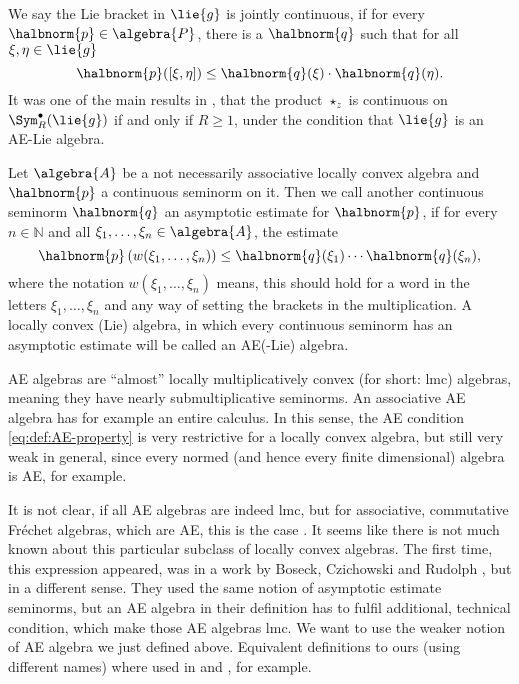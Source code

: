 \documentclass[
11pt,                          %
english                        %
]{article}
\begin{document}
We say the Lie bracket in $\lie{g}$ is jointly continuous, if for every 
$\halbnorm{p} \in \algebra{P}$, there is a $\halbnorm{q}$ such that for all $\xi, 
\eta \in \lie{g}$
\begin{equation}
	\label{eq:continuity-of-liebracket}
	\halbnorm{p}([\xi, \eta])
	\leq
	\halbnorm{q}(\xi) \cdot \halbnorm{q}(\eta).
\end{equation}
It was one of the main results in \cite{esposito.stapor.waldmann:2015a:pre}, that 
the product $\star_z$ is continuous on $\Sym_R^{\bullet}(\lie{g})$ if and only if 
$R \geq 1$, under the condition that $\lie{g}$ is an AE-Lie algebra.
\begin{definition}[AE-algebra]
	\label{def:AE-algebra}
	Let $\algebra{A}$ be a not necessarily associative locally convex algebra
	and $\halbnorm{p}$ a continuous seminorm on it. Then we call
	another continuous seminorm $\halbnorm{q}$ an asymptotic estimate for 
	$\halbnorm{p}$, if for every $n \in \mathbb{N}$ and all $\xi_1, \ldots, \xi_n
	\in \algebra{A}$, the estimate
	\begin{equation}
		\label{eq:def:AE-property}
		\halbnorm{p}\left(
			w(\xi_1, \ldots, \xi_n)
		\right)
		\leq
		\halbnorm{q}(\xi_1) \cdots \halbnorm{q}(\xi_n),
	\end{equation}
	where the notation $w(\xi_1, \ldots, \xi_n)$ means, this should hold for a word 
	in the letters $\xi_1, \ldots, \xi_n$ and any
	way of setting the brackets in the multiplication. A locally convex (Lie) 
	algebra, in which every continuous seminorm has an asymptotic estimate will be 
	called an AE(-Lie) algebra.
\end{definition}
AE algebras are ``almost'' locally multiplicatively convex (for short: lmc) 
algebras, meaning they have nearly submultiplicative seminorms. An associative AE 
algebra has for example an entire calculus. In this sense, the AE condition 
\eqref{eq:def:AE-property} is very restrictive for a locally convex algebra, but 
still very weak in general, since every normed (and hence every finite dimensional) 
algebra is AE, for example.

It is not clear, if all AE algebras are indeed lmc, but for associative, commutative 
Fr\'echet algebras, which are AE, this is the case 
\cite{mitiagin.rolewicz.zelazko:1962a}. It seems like there is not much known about 
this particular subclass of locally convex algebras. The first time, this expression 
appeared, was in a work by Boseck, Czichowski and Rudolph 
\cite{boseck.czichowski.rudolph:1981a}, but in a different sense. They used the same 
notion of asymptotic estimate seminorms, but an AE algebra in their definition has to 
fulfil additional, technical condition, which make those AE algebras lmc. We want to 
use the weaker notion of AE algebra we just defined above. Equivalent definitions to 
ours (using different names) where used in \cite{gloeckner.neeb:2012a} and 
\cite{bogfjellmo.dahmen.schmedig:2015a}, for example.
\end{document}
